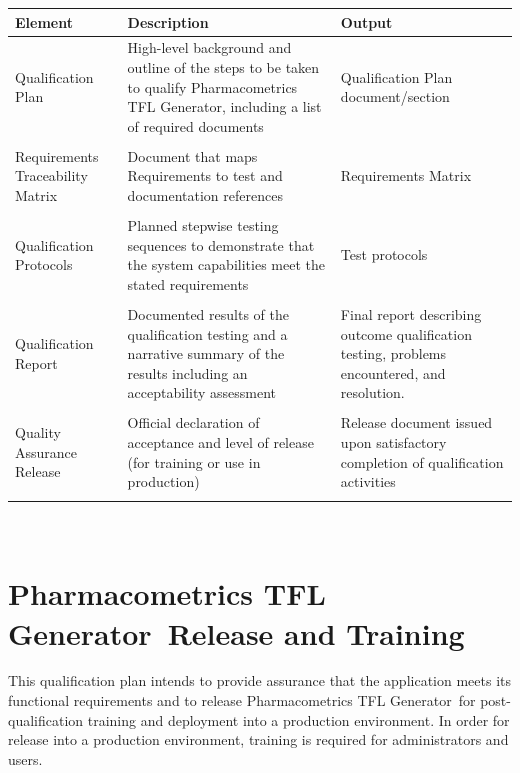 \documentclass{article}
\newcommand{\tfl}{Pharmacometrics TFL Generator}
\begin{document}
\begin{tabular}{|p{5cm}|p{5cm}|p{5cm}|}\hline
\textbf{Element} & \textbf{Description} & \textbf{Output}\\\hline
Qualification Plan & High-level background and outline of the steps to be taken to qualify \tfl, including a list of required documents & Qualification Plan document/section\\
&&\\
Requirements Traceability Matrix&Document that maps Requirements to test and documentation references &Requirements Matrix\\
&&\\


Qualification Protocols&Planned stepwise testing sequences to demonstrate that the system capabilities meet the stated requirements&Test protocols\\
&&\\
Qualification Report&Documented results of the qualification testing and a narrative summary of the results including an acceptability assessment&Final report describing outcome qualification testing, problems encountered, and resolution.\\
&&\\
Quality Assurance Release&Official declaration of acceptance and level of release (for training or use in production)&Release document issued upon satisfactory completion of qualification activities\\
&&\\\hline
\end{tabular}\\


\section*{\tfl\ Release and Training}

This qualification plan intends to provide assurance that the application meets its functional requirements and to release \tfl\ for post-qualification training and deployment into a production environment. In order for release into a production environment, training is required for administrators and users.
\end{document}
